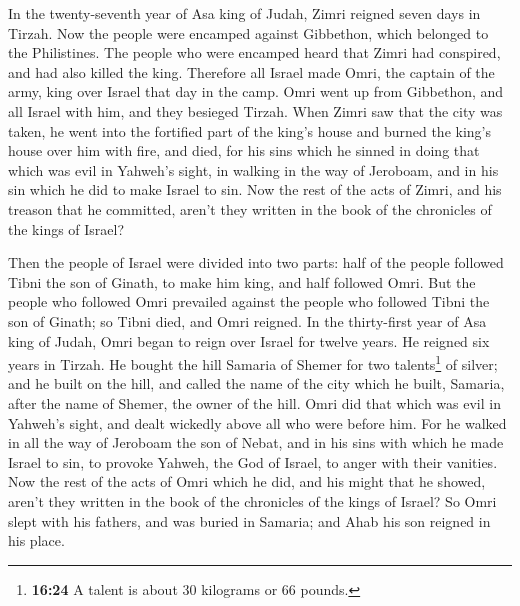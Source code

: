  In the twenty-seventh year of Asa king of Judah, Zimri
reigned seven days in Tirzah. Now the people were encamped against
Gibbethon, which belonged to the Philistines.  The people
who were encamped heard that Zimri had conspired, and had also killed
the king. Therefore all Israel made Omri, the captain of the army, king
over Israel that day in the camp.  Omri went up from
Gibbethon, and all Israel with him, and they besieged Tirzah.
 When Zimri saw that the city was taken, he went into the
fortified part of the king's house and burned the king's house over him
with fire, and died,  for his sins which he sinned in
doing that which was evil in Yahweh's sight, in walking in the way of
Jeroboam, and in his sin which he did to make Israel to sin.
 Now the rest of the acts of Zimri, and his treason that
he committed, aren't they written in the book of the chronicles of the
kings of Israel?

 Then the people of Israel were divided into two parts:
half of the people followed Tibni the son of Ginath, to make him king,
and half followed Omri.  But the people who followed Omri
prevailed against the people who followed Tibni the son of Ginath; so
Tibni died, and Omri reigned.  In the thirty-first year
of Asa king of Judah, Omri began to reign over Israel for twelve years.
He reigned six years in Tirzah.  He bought the hill
Samaria of Shemer for two talents\footnote{\textbf{16:24} A talent is
  about 30 kilograms or 66 pounds.} of silver; and he built on the hill,
and called the name of the city which he built, Samaria, after the name
of Shemer, the owner of the hill.  Omri did that which
was evil in Yahweh's sight, and dealt wickedly above all who were before
him.  For he walked in all the way of Jeroboam the son of
Nebat, and in his sins with which he made Israel to sin, to provoke
Yahweh, the God of Israel, to anger with their vanities. 
Now the rest of the acts of Omri which he did, and his might that he
showed, aren't they written in the book of the chronicles of the kings
of Israel?  So Omri slept with his fathers, and was
buried in Samaria; and Ahab his son reigned in his place.

